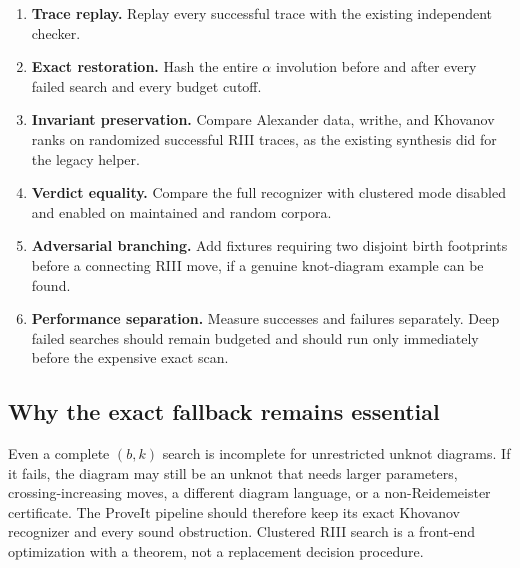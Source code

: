\begin{enumerate}
\item \textbf{Trace replay.}  Replay every successful trace with the existing
      independent checker.
\item \textbf{Exact restoration.}  Hash the entire $\alpha$ involution before
      and after every failed search and every budget cutoff.
\item \textbf{Invariant preservation.}  Compare Alexander data, writhe, and
      Khovanov ranks on randomized successful RIII traces, as the existing
      synthesis did for the legacy helper.
\item \textbf{Verdict equality.}  Compare the full recognizer with clustered
      mode disabled and enabled on maintained and random corpora.
\item \textbf{Adversarial branching.}  Add fixtures requiring two disjoint
      birth footprints before a connecting RIII move, if a genuine knot-diagram
      example can be found.
\item \textbf{Performance separation.}  Measure successes and failures
      separately.  Deep failed searches should remain budgeted and should run
      only immediately before the expensive exact scan.
\end{enumerate}

\subsection{Why the exact fallback remains essential}

Even a complete $(b,k)$ search is incomplete for unrestricted unknot diagrams.
If it fails, the diagram may still be an unknot that needs larger parameters,
crossing-increasing moves, a different diagram language, or a non-Reidemeister
certificate.  The ProveIt pipeline should therefore keep its exact Khovanov
recognizer and every sound obstruction.  Clustered RIII search is a front-end
optimization with a theorem, not a replacement decision procedure.
